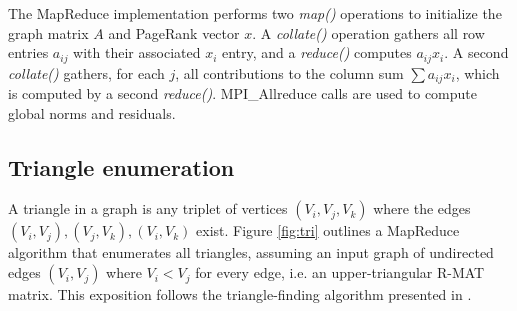 The MapReduce implementation performs two {\it map()} operations to
initialize the graph matrix $A$ and PageRank vector $x$.  A {\it
collate()} operation gathers all row entries $a_{ij}$ with their
associated $x_i$ entry, and a {\it reduce()} computes $a_{ij} x_i$.  A
second {\it collate()} gathers, for each $j$, all contributions to the
column sum $\sum a_{ij} x_i$, which is computed by a second {\it
reduce()}.  MPI\_Allreduce calls are used to compute global norms and
residuals.

\subsection{Triangle enumeration}

A triangle in a graph is any triplet of vertices $(V_i,V_j,V_k)$ where
the edges $(V_i,V_j), (V_j,V_k), (V_i,V_k)$ exist.  Figure
\ref{fig:tri} outlines a MapReduce algorithm that enumerates all
triangles, assuming an input graph of undirected edges $(V_i,V_j)$
where $V_i < V_j$ for every edge, i.e. an upper-triangular R-MAT
matrix.  This exposition follows the triangle-finding algorithm
presented in \cite{Cohen}.

